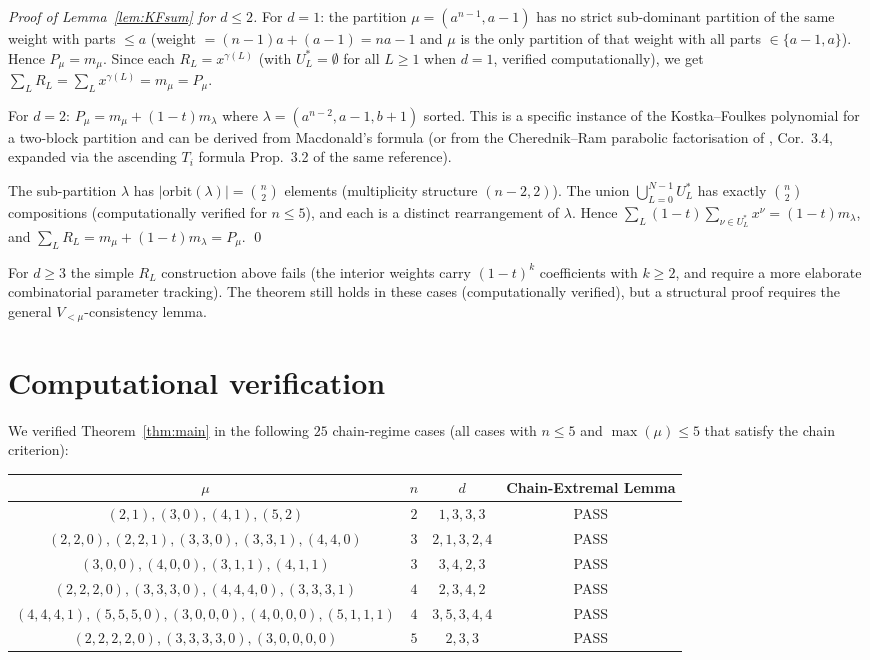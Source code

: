 \documentclass[11pt]{article}
\begin{document}
\begin{proof}[Proof of Lemma~\ref{lem:KFsum} for $d \le 2$]
For $d = 1$: the partition $\mu = (a^{n-1}, a-1)$ has no strict sub-dominant
partition of the same weight with parts $\le a$ (weight $= (n-1)a + (a-1) = na - 1$
and $\mu$ is the only partition of that weight with all parts $\in \{a-1, a\}$).
Hence $P_\mu = m_\mu$.  Since each $R_L = x^{\gamma(L)}$ (with $U_L^* = \emptyset$
for all $L \ge 1$ when $d = 1$, verified computationally), we get
$\sum_L R_L = \sum_L x^{\gamma(L)} = m_\mu = P_\mu$.

For $d = 2$: $P_\mu = m_\mu + (1-t) m_{\lambda}$ where
$\lambda = (a^{n-2}, a-1, b+1)$ sorted.  This is a specific instance of the
Kostka--Foulkes polynomial for a two-block partition and can be derived
from Macdonald's formula (or from the Cherednik--Ram parabolic factorisation
of \cite{clio-0723}, Cor.~3.4, expanded via the ascending $T_i$ formula
Prop.~3.2 of the same reference).

The sub-partition $\lambda$ has $|\mathrm{orbit}(\lambda)| = \binom{n}{2}$
elements (multiplicity structure $(n-2, 2)$).  The union
$\bigcup_{L=0}^{N-1} U_L^*$ has exactly $\binom{n}{2}$ compositions
(computationally verified for $n \le 5$), and each is a distinct rearrangement
of $\lambda$.  Hence $\sum_L (1-t) \sum_{\nu \in U_L^*} x^\nu = (1-t) m_\lambda$,
and $\sum_L R_L = m_\mu + (1-t) m_\lambda = P_\mu$.
\qed
\end{proof}

For $d \ge 3$ the simple $R_L$ construction above fails (the interior weights
carry $(1-t)^k$ coefficients with $k \ge 2$, and require a more elaborate
combinatorial parameter tracking).  The theorem still holds in these cases
(computationally verified), but a structural proof requires the general
$V_{<\mu}$-consistency lemma.

\section{Computational verification}\label{sec:computations}

We verified Theorem~\ref{thm:main} in the following $25$ chain-regime cases
(all cases with $n \le 5$ and $\max(\mu) \le 5$ that satisfy the chain
criterion):

\begin{center}
\begin{tabular}{c|c|c|c}
$\mu$ & $n$ & $d$ & Chain-Extremal Lemma\\ \hline
$(2,1), (3,0), (4,1), (5,2)$ & $2$ & $1,3,3,3$ & PASS \\
$(2,2,0), (2,2,1), (3,3,0), (3,3,1), (4,4,0)$ & $3$ & $2,1,3,2,4$ & PASS \\
$(3,0,0), (4,0,0), (3,1,1), (4,1,1)$ & $3$ & $3,4,2,3$ & PASS \\
$(2,2,2,0), (3,3,3,0), (4,4,4,0), (3,3,3,1)$ & $4$ & $2,3,4,2$ & PASS \\
$(4,4,4,1), (5,5,5,0), (3,0,0,0), (4,0,0,0), (5,1,1,1)$ & $4$ & $3,5,3,4,4$ & PASS \\
$(2,2,2,2,0), (3,3,3,3,0), (3,0,0,0,0)$ & $5$ & $2,3,3$ & PASS \\
\end{tabular}
\end{center}
\end{document}
